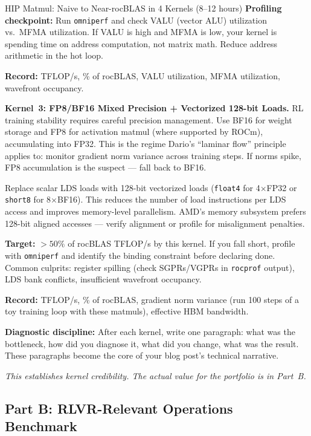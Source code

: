 \begin{exercise}{HIP Matmul: Naive to Near-rocBLAS in 4 Kernels (8--12 hours)}
\textbf{Profiling checkpoint:} Run \texttt{omniperf} and check VALU (vector ALU) utilization vs.\ MFMA utilization. If VALU is high and MFMA is low, your kernel is spending time on address computation, not matrix math. Reduce address arithmetic in the hot loop.

\textbf{Record:} TFLOP/s, \% of rocBLAS, VALU utilization, MFMA utilization, wavefront occupancy.

\medskip
\textbf{Kernel~3: FP8/BF16 Mixed Precision + Vectorized 128-bit Loads.}
RL training stability requires careful precision management. Use BF16 for weight storage and FP8 for activation matmul (where supported by ROCm), accumulating into FP32. This is the regime Dario's ``laminar flow'' principle applies to: monitor gradient norm variance across training steps. If norms spike, FP8 accumulation is the suspect --- fall back to BF16.

Replace scalar LDS loads with 128-bit vectorized loads (\texttt{float4} for 4$\times$FP32 or \texttt{short8} for 8$\times$BF16). This reduces the number of load instructions per LDS access and improves memory-level parallelism. AMD's memory subsystem prefers 128-bit aligned accesses --- verify alignment or profile for misalignment penalties.

\textbf{Target:} $>50\%$ of rocBLAS TFLOP/s by this kernel. If you fall short, profile with \texttt{omniperf} and identify the binding constraint before declaring done. Common culprits: register spilling (check SGPRs/VGPRs in \texttt{rocprof} output), LDS bank conflicts, insufficient wavefront occupancy.

\textbf{Record:} TFLOP/s, \% of rocBLAS, gradient norm variance (run 100 steps of a toy training loop with these matmuls), effective HBM bandwidth.

\medskip
\textbf{Diagnostic discipline:} After each kernel, write one paragraph: what was the bottleneck, how did you diagnose it, what did you change, what was the result. These paragraphs become the core of your blog post's technical narrative.

\textit{This establishes kernel credibility. The actual value for the portfolio is in Part~B.}
\end{exercise}

\subsection{Part B: RLVR-Relevant Operations Benchmark}

